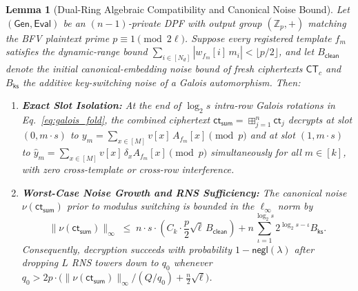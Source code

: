 \documentclass[11pt,a4paper]{article}
\newtheorem{lemma}{Lemma}
\begin{document}
\begin{lemma}[Dual-Ring Algebraic Compatibility and Canonical Noise Bound]\label{lem:dual_ring}
Let $(\mathsf{Gen}, \mathsf{Eval})$ be an $(n-1)$-private DPF with output group $(\mathbb{Z}_p, +)$ matching the BFV plaintext prime $p \equiv 1 \pmod{2\ell}$. Suppose every registered template $f_m$ satisfies the dynamic-range bound $\sum_{i \in [N_d]} |w_{f_m}[i]\, m_i| < \lfloor p/2 \rfloor$, and let $B_{\mathsf{clean}}$ denote the initial canonical-embedding noise bound of fresh ciphertexts $\mathsf{CT}_c$ and $B_{\mathsf{ks}}$ the additive key-switching noise of a Galois automorphism. Then:
\begin{enumerate}\setlength{\itemsep}{2pt}\setlength{\parskip}{0pt}
    \item \textbf{Exact Slot Isolation:} At the end of $\log_2 s$ intra-row Galois rotations in Eq.~\eqref{eq:galois_fold}, the combined ciphertext $\mathsf{ct}_{\mathsf{sum}} = \boxplus_{j=1}^n \mathsf{ct}_j$ decrypts at slot $(0, m\cdot s)$ to $y_m = \sum_{x \in [M]} v[x]\, A_{f_m}[x] \pmod p$ and at slot $(1, m\cdot s)$ to $\hat{y}_m = \sum_{x \in [M]} v[x]\, \delta_x A_{f_m}[x] \pmod p$ simultaneously for all $m \in [k]$, with zero cross-template or cross-row interference.
    \item \textbf{Worst-Case Noise Growth and RNS Sufficiency:} The canonical noise $\nu(\mathsf{ct}_{\mathsf{sum}})$ prior to modulus switching is bounded in the $\ell_\infty$ norm by
    \begin{equation}
        \|\nu(\mathsf{ct}_{\mathsf{sum}})\|_{\infty} \;\le\; n \cdot s \cdot \left( C_k \cdot \frac{p}{2}\sqrt{\ell}\, B_{\mathsf{clean}} \right) + n \sum_{\iota=1}^{\log_2 s} 2^{\log_2 s - \iota} B_{\mathsf{ks}}.
    \end{equation}
    Consequently, decryption succeeds with probability $1 - \mathsf{negl}(\lambda)$ after dropping $L$ RNS towers down to $q_0$ whenever $q_0 > 2p \cdot \big( \|\nu(\mathsf{ct}_{\mathsf{sum}})\|_{\infty} / (Q/q_0) + \frac{n}{2}\sqrt{\ell} \big)$.
\end{enumerate}
\end{lemma}
\end{document}
